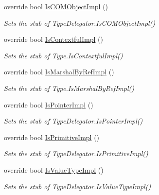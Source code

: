 \begin{DoxyCompactItemize}
override bool \hyperlink{class_system_1_1_reflection_1_1_fakes_1_1_stub_type_delegator_a7d46063fa792bc2645fad1e4d560e0e6}{Is\-C\-O\-M\-Object\-Impl} ()
\begin{DoxyCompactList}\small\item\em Sets the stub of Type\-Delegator.\-Is\-C\-O\-M\-Object\-Impl()\end{DoxyCompactList}\item 
override bool \hyperlink{class_system_1_1_reflection_1_1_fakes_1_1_stub_type_delegator_ad1b2b1536fd9cb0153dbc1302c51e641}{Is\-Contextful\-Impl} ()
\begin{DoxyCompactList}\small\item\em Sets the stub of Type.\-Is\-Contextful\-Impl()\end{DoxyCompactList}\item 
override bool \hyperlink{class_system_1_1_reflection_1_1_fakes_1_1_stub_type_delegator_a2ed2bc262f959555335d96c6063de39f}{Is\-Marshal\-By\-Ref\-Impl} ()
\begin{DoxyCompactList}\small\item\em Sets the stub of Type.\-Is\-Marshal\-By\-Ref\-Impl()\end{DoxyCompactList}\item 
override bool \hyperlink{class_system_1_1_reflection_1_1_fakes_1_1_stub_type_delegator_a25594372d8f137cceab2e3950c35d742}{Is\-Pointer\-Impl} ()
\begin{DoxyCompactList}\small\item\em Sets the stub of Type\-Delegator.\-Is\-Pointer\-Impl()\end{DoxyCompactList}\item 
override bool \hyperlink{class_system_1_1_reflection_1_1_fakes_1_1_stub_type_delegator_a141865ade84a9f24a51b2983dccb0fce}{Is\-Primitive\-Impl} ()
\begin{DoxyCompactList}\small\item\em Sets the stub of Type\-Delegator.\-Is\-Primitive\-Impl()\end{DoxyCompactList}\item 
override bool \hyperlink{class_system_1_1_reflection_1_1_fakes_1_1_stub_type_delegator_a87427fffe60f50187d63ceed31eab6a1}{Is\-Value\-Type\-Impl} ()
\begin{DoxyCompactList}\small\item\em Sets the stub of Type\-Delegator.\-Is\-Value\-Type\-Impl()\end{DoxyCompactList}\end{DoxyCompactItemize}
